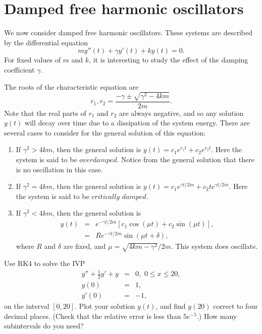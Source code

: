 \section*{Damped free harmonic oscillators}
We now consider damped free harmonic oscillators. These systems are described by the differential equation
\[my''(t) +\gamma y'(t) + ky(t) = 0.\]
For fixed values of $m$ and $k$, it is interesting to study the effect of the damping coefficient $\gamma$. 

The roots of the characteristic equation are \[r_1,r_2 = \frac{-\gamma \pm \sqrt{\gamma^2 -4km}}{2m} .\]
Note that the real parts of $r_1$ and $r_2$ are always negative, and so any solution $y(t)$ will decay over time due to a dissipation of the system energy. There are several cases to consider for the general solution of this equation: 
\begin{enumerate}
\item If $\gamma^2 > 4km$, then the general solution is $y(t) = c_1 e^{r_1t} + c_2e^{r_2t}$. Here the system is said to be $\textit{overdamped}$. Notice from the general solution that there is no oscillation in this case.
\item If $\gamma^2 = 4km$, then the general solution is $y(t) = c_1 e^{\gamma t/2m} + c_2 te^{\gamma t/2m}$. Here the system is said to be $\textit{critically damped}$. 
\item If $\gamma^2 < 4km$, then the general solution is 
\begin{eqnarray*}
y(t) &=& e^{-\gamma t/2m} \left[c_1\cos(\mu t) + c_2 \sin (\mu t)\right],\\
&=& R e^{-\gamma t/2m}  \sin (\mu t + \delta),
\end{eqnarray*}
where $R$ and $\delta$ are fixed, and $\mu = \sqrt{4km-\gamma^2}/2m.$ This system does oscillate.
\end{enumerate}



\begin{problem}
Use RK4 to solve the IVP
\begin{eqnarray*}
y'' +\frac{1}{2} y'+ y &=& 0, \,\, 0 \leq x \leq 20,\\
y(0) &=& 1, \\
y'(0) &=& -1,
\end{eqnarray*} 
on the interval $[0,20]$. Plot your solution $y(t)$, and find $y(20)$ correct to four decimal places. (Check that the relative error is less than $5e^{-5}$.)  How many subintervals do you need?
\end{problem}



